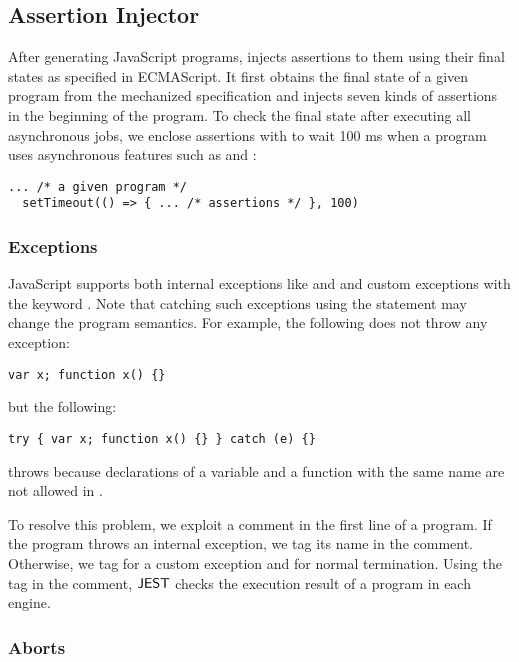 \subsection{Assertion Injector}

After generating JavaScript programs,  injects
assertions to them using their final states as specified in ECMAScript.
It first obtains the final state of a given program from the
mechanized specification and injects seven kinds of assertions in the beginning of the program.
To check the final state after executing all asynchronous jobs,
we enclose assertions with  to wait 100 ms when a
program uses asynchronous features such as  and :
\begin{lstlisting}[style=myJSstyle]
  ... /* a given program */
  setTimeout(() => { ... /* assertions */ }, 100)
\end{lstlisting}


\subsubsection{Exceptions}

JavaScript supports both internal exceptions like  and
 and custom exceptions with the keyword .
Note that catching such exceptions using the  statement
may change the program semantics.  For example, the following does not throw any exception:
\begin{lstlisting}[style=myJSstyle]
    var x; function x() {}
\end{lstlisting}
but the following:
\begin{lstlisting}[style=myJSstyle]
    try { var x; function x() {} } catch (e) {}
\end{lstlisting}
throws  because declarations of a variable and a function
with the same name are not allowed in .

To resolve this problem, we exploit a comment in the first line of a program.
If the program throws an internal exception, we tag its name in the comment.
Otherwise, we tag  for a custom exception and  for
normal termination.  Using the tag in the comment, $\tool$ checks the
execution result of a program in each engine.


\subsubsection{Aborts}

